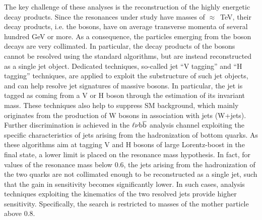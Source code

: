 The key challenge of these analyses is the reconstruction of the highly energetic decay products.
Since the resonances under study have masses of $\approx$~TeV, their decay products, i.e. the bosons,
have on average transverse momenta of several hundred GeV or more.
As a consequence, the particles emerging from the boson decays are very collimated.
In particular, the decay products of the bosons cannot be resolved using the standard algorithms,
but are instead reconstructed as a single jet object. Dedicated techniques, so-called jet ``V tagging'' and ``H tagging'' techniques,
are applied to exploit the substructure of such jet objects, and can help resolve jet signatures of massive bosons.
In particular, the jet is tagged as coming from a V or H boson through the estimation of its invariant mass.
These techniques also help to suppress SM background, which mainly originates from the production of W bosons in association with jets (W+jets).
Further discrimination is achieved in the $\ell\nu{\mathrm{b}\overline{\mathrm{b}}}$ analysis channel exploiting the specific characteristics of jets arising from the hadronization of bottom quarks.
As these algorithms aim at tagging V and H bosons of large Lorentz-boost in the final state, a lower limit is placed on the resonance mass hypothesis.
In fact, for values of the resonance mass below 0.6\TeV, the jets arising from the hadronization of the two quarks are not collimated enough to be reconstructed as a single jet,
such that the gain in sensitivity becomes significantly lower. In such cases, analysis techniques exploiting the kinematics of the two resolved jets provide higher sensitivity.
Specifically, the  search is restricted to masses of the mother particle above 0.8\TeV.


